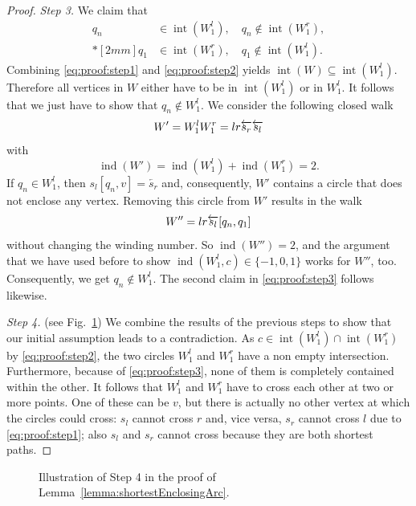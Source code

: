 \documentclass[reqno]{amsart}
\let\join\relax
\DeclareMathOperator{\join}{\dot{+}}
\DeclareMathOperator{\ind}{ind}
\DeclareMathOperator{\interior}{int}
\begin{document}
\begin{proof}
\medskip

\emph{Step 3.} We claim that
\begin{equation}\label{eq:proof:step3}
	\begin{aligned}
		q_n &\in \interior(W^l_1),\quad q_n \notin \interior(W^r_1),\\*[2mm]
		q_1 &\in \interior(W^r_1),\quad q_1 \notin \interior(W^l_1).
	\end{aligned}
\end{equation}
Combining \eqref{eq:proof:step1} and \eqref{eq:proof:step2} yields $\interior(W) \subseteq \interior(W^l_1)$. Therefore all vertices in $W$ either have to be in $\interior(W^l_1)$ or in $W^l_1$. It follows that we just have to show that $q_n \notin W^l_1$. We consider the following closed walk 
\[
	W' = W^l_1 \join W^r_1 = l \join r \join \overleftarrow{s_r} \join \overleftarrow{s_l}
\]
with
\[
	\ind(W') = \ind(W^l_1) + \ind(W^r_1) = 2.
\]
If $q_n \in W^l_1$, then $s_l[q_n,v] = \overleftarrow{s_r}$ and, consequently, $W'$ contains a circle that does not enclose any vertex. Removing this circle from $W'$ results in the walk
\[
	W'' = l \join r \join \overleftarrow{s_l}[q_n,q_1] 
\]
without changing the winding number. So $\ind(W'') = 2$, and the argument that we have used before to show $\ind(W^l_1,c) \in \{-1,0,1\}$ works for $W''$, too. Consequently, we get $q_n \notin W^l_1$. The second claim in \eqref{eq:proof:step3} follows likewise.

\medskip

\emph{Step 4.} (see Fig.~\ref{fig:proofStep4}) We combine the results of the previous steps to show that our initial assumption leads to a contradiction. As $c \in \interior(W^l_1) \cap \interior(W^r_1)$ by \eqref{eq:proof:step2}, the two circles $W^l_1$ and $W^r_1$ have a non empty intersection. Furthermore, because of \eqref{eq:proof:step3}, none of them is completely contained within the other. It follows that $W^l_1$ and $W^r_1$ have to cross each other at two or more points. One of these can be $v$, but there is actually no other vertex at which the circles could cross: $s_l$ cannot cross $r$ and, vice versa, $s_r$ cannot cross $l$ due to \eqref{eq:proof:step1}; also $s_l$ and $s_r$ cannot cross because they are both shortest paths. 
\end{proof}

\usetikzlibrary{shapes.geometric}
\begin{figure}[tbp]
	\begin{center}
		
	\end{center}
	\caption{Illustration of Step 4 in the proof of Lemma~\ref{lemma:shortestEnclosingArc}.}
	\label{fig:proofStep4}
\end{figure}
\end{document}
